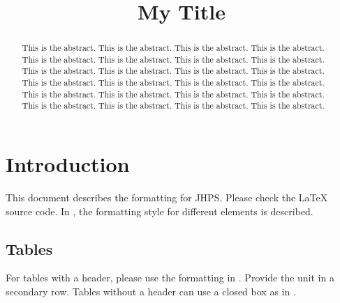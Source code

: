\documentclass{jhps}
\begin{document}


\title{My Title}


\maketitle

\begin{abstract}
This is the abstract. This is the abstract. This is the abstract. This is the abstract. This is the abstract. This is the abstract. This is the abstract. This is the abstract. This is the abstract. This is the abstract. This is the abstract. This is the abstract. This is the abstract. This is the abstract. This is the abstract. This is the abstract. This is the abstract. This is the abstract. This is the abstract. This is the abstract. This is the abstract. This is the abstract. This is the abstract. This is the abstract.
\end{abstract}

\section{Introduction}
\label{sec:intro}

This document describes the formatting for JHPS.
Please check the LaTeX source code. In , the formatting style for different elements is described.

\subsection{Tables}

For tables with a header, please use the formatting in .
Provide the unit in a secondary row.
Tables without a header can use a closed box as in .
\end{document}
